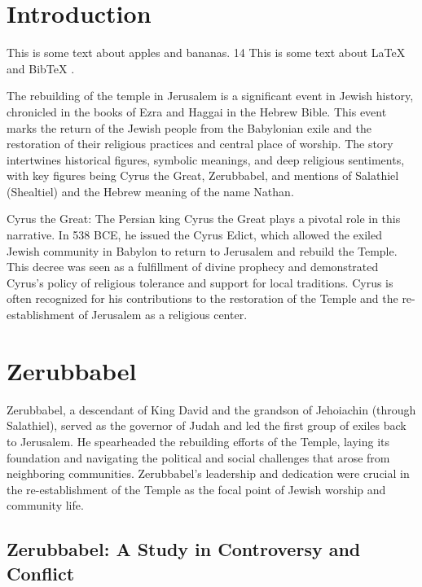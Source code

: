 
\doublespacing 

\chapter{Introduction}

This is some text about apples and bananas.
 14 This is some text about LaTeX \cite{latex_guide} and BibTeX \cite{bibtex_gui    de}.

 The rebuilding of the temple in Jerusalem is a significant event in Jewish history, chronicled in the books of Ezra and Haggai in the Hebrew Bible. This event marks the return of the Jewish people from the Babylonian exile and the restoration of their religious practices and central place of worship. The story intertwines historical figures, symbolic meanings, and deep religious sentiments, with key figures being Cyrus the Great, Zerubbabel, and mentions of Salathiel (Shealtiel) and the Hebrew meaning of the name Nathan.

Cyrus the Great: The Persian king Cyrus the Great plays a pivotal role in this narrative. In 538 BCE, he issued the Cyrus Edict, which allowed the exiled Jewish community in Babylon to return to Jerusalem and rebuild the Temple. This decree was seen as a fulfillment of divine prophecy and demonstrated Cyrus's policy of religious tolerance and support for local traditions. Cyrus is often recognized for his contributions to the restoration of the Temple and the re-establishment of Jerusalem as a religious center.

\chapter{Zerubbabel} 

Zerubbabel, a descendant of King David and the grandson of Jehoiachin (through Salathiel), served as the governor of Judah and led the first group of exiles back to Jerusalem. He spearheaded the rebuilding efforts of the Temple, laying its foundation and navigating the political and social challenges that arose from neighboring communities. Zerubbabel's leadership and dedication were crucial in the re-establishment of the Temple as the focal point of Jewish worship and community life.

\section{Zerubbabel: A Study in Controversy and Conflict}

